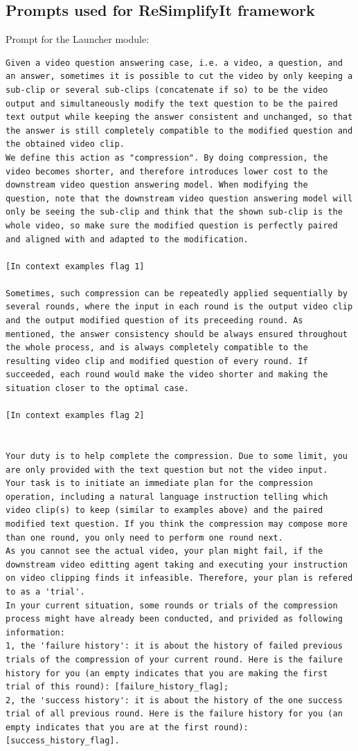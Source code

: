 \subsection{Prompts used for ReSimplifyIt framework}
Prompt for the Launcher module:
\begin{lstlisting}
Given a video question answering case, i.e. a video, a question, and an answer, sometimes it is possible to cut the video by only keeping a sub-clip or several sub-clips (concatenate if so) to be the video output and simultaneously modify the text question to be the paired text output while keeping the answer consistent and unchanged, so that the answer is still completely compatible to the modified question and the obtained video clip. 
We define this action as "compression". By doing compression, the video becomes shorter, and therefore introduces lower cost to the downstream video question answering model. When modifying the question, note that the downstream video question answering model will only be seeing the sub-clip and think that the shown sub-clip is the whole video, so make sure the modified question is perfectly paired and aligned with and adapted to the modification. 

[In context examples flag 1]

Sometimes, such compression can be repeatedly applied sequentially by several rounds, where the input in each round is the output video clip and the output modified question of its preceeding round. As mentioned, the answer consistency should be always ensured throughout the whole process, and is always completely compatible to the resulting video clip and modified question of every round. If succeeded, each round would make the video shorter and making the situation closer to the optimal case.

[In context examples flag 2]


Your duty is to help complete the compression. Due to some limit, you are only provided with the text question but not the video input.
Your task is to initiate an immediate plan for the compression operation, including a natural language instruction telling which video clip(s) to keep (similar to examples above) and the paired modified text question. If you think the compression may compose more than one round, you only need to perform one round next.
As you cannot see the actual video, your plan might fail, if the downstream video editting agent taking and executing your instruction on video clipping finds it infeasible. Therefore, your plan is refered to as a 'trial'. 
In your current situation, some rounds or trials of the compression process might have already been conducted, and privided as following information:
1, the 'failure history': it is about the history of failed previous trials of the compression of your current round. Here is the failure history for you (an empty indicates that you are making the first trial of this round): [failure_history_flag];
2, the 'success history': it is about the history of the one success trial of all previous round. Here is the failure history for you (an empty indicates that you are at the first round): [success_history_flag].


\end{lstlisting}
